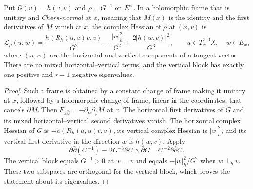 \begin{lemma}\label{lem:reciprocal-bundle-norm-levi}
Put $G(v)=h(v,v)$ and $\rho=G^{-1}$ on $E^\times$. In a holomorphic frame that is unitary and \emph{Chern-normal} at $x$, meaning that $M(x)$ is the identity and the first derivatives of $M$ vanish at $x$, the complex Hessian of $\rho$ at $(x,v)$ is
\[
 \mathcal L_\rho(u,w)
 =\frac{h(R_h(u,\bar u)v,v)}{G^2}
  -\frac{|w|_h^2}{G^2}
  +\frac{2|h(w,v)|^2}{G^3},
 \qquad u\in T_x^{1,0}X,\quad w\in E_x,
\]
where $(u,w)$ are the horizontal and vertical components of a tangent vector. There are no mixed horizontal--vertical terms, and the vertical block has exactly one positive and $r-1$ negative eigenvalues.
\end{lemma}
\begin{proof}
Such a frame is obtained by a constant change of frame making it unitary at $x$, followed by a holomorphic change of frame, linear in the coordinates, that cancels $\partial M$. Then $F_{\alpha\bar\beta}=-\partial_\alpha\partial_{\bar\beta}M$ at $x$. The horizontal first derivatives of $G$ and its mixed horizontal--vertical second derivatives vanish. The horizontal complex Hessian of $G$ is $-h(R_h(u,\bar u)v,v)$, its vertical complex Hessian is $|w|_h^2$, and its vertical first derivative in the direction $w$ is $h(w,v)$. Apply
\[
 \partial\bar\partial(G^{-1})
 =2G^{-3}\partial G\wedge\bar\partial G-G^{-2}\partial\bar\partial G.
\]
The vertical block equals $G^{-1}>0$ at $w=v$ and equals $-|w|_h^2/G^2$ when $w\perp_h v$. These two subspaces are orthogonal for the vertical block, which proves the statement about its eigenvalues.
\end{proof}


